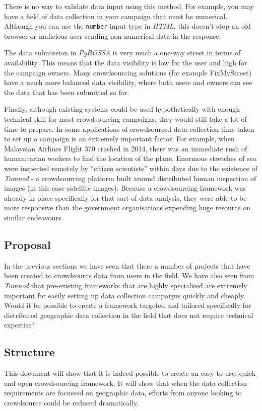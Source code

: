 \documentclass{article}
\begin{document}
		There is no way to validate data input using this method. For example, you may have a field of data collection in your campaign that must be numerical. Although you can use the \texttt{number} input type in \emph{HTML}, this doesn't stop an old browser or malicious user sending non-numerical data in the response.

		The data submission in \emph{PyBOSSA} is very much a one-way street in terms of availability. This means that the data visibility is low for the user and high for the campaign owners. Many crowdsourcing solutions (for example FixMyStreet) have a much more balanced data visibility, where both users and owners can see the data that has been submitted so far.

		Finally, although existing systems could be used hypothetically with enough technical skill for most crowdsourcing campaigns, they would still take a lot of time to prepare. In some applications of crowdsourced data collection time taken to set up a campaign is an extremely important factor. For example, when Malaysian Airlines Flight 370 crashed in 2014, there was an immediate rush of humanitarian workers to find the location of the plane. Enormous stretches of sea were inspected remotely by ``citizen scientists'' within days due to the existence of \emph{Tomnod} - a crowdsourcing platform built around distributed human inspection of images (in this case satellite images)\cite{_missing_2014}. Because a crowdsourcing framework was already in place specifically for that sort of data analysis, they were able to be more responsive than the government organisations expending huge resource on similar endeavours.

		\subsection{Proposal}
		In the previous sections we have seen that there a number of projects that have been created to crowdsource data from users in the field. We have also seen from \emph{Tomnod} that pre-existing frameworks that are highly specialised are extremely important for easily setting up data collection campaigns quickly and cheaply. Would it be possible to create a framework targeted and tailored specifically for distributed geographic data collection in the field that does not require technical expertise?

		\subsection{Structure}
		This document will show that it is indeed possible to create an easy-to-use, quick and open crowdsourcing framework. It will show that when the data collection requirements are focussed on geographic data, efforts from anyone looking to crowdsource could be reduced dramatically.
\end{document}
